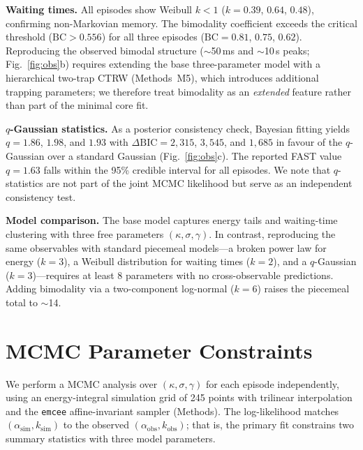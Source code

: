 \documentclass[twocolumn]{article}
\begin{document}
\textbf{Waiting times.} All episodes show Weibull $k < 1$ ($k = 0.39$, $0.64$, $0.48$), confirming non-Markovian memory. The bimodality coefficient exceeds the critical threshold ($\mathrm{BC} > 0.556$) for all three episodes ($\mathrm{BC} = 0.81$, $0.75$, $0.62$). Reproducing the observed bimodal structure ($\sim$50\,ms and $\sim$10\,s peaks; Fig.~\ref{fig:obs}b) requires extending the base three-parameter model with a hierarchical two-trap CTRW (Methods~M5), which introduces additional trapping parameters; we therefore treat bimodality as an \emph{extended} feature rather than part of the minimal core fit.

\textbf{$q$-Gaussian statistics.} As a posterior consistency check, Bayesian fitting yields $q = 1.86$, $1.98$, and $1.93$ with $\Delta\mathrm{BIC} = 2{,}315$, $3{,}545$, and $1{,}685$ in favour of the $q$-Gaussian over a standard Gaussian\cite{kass1995} (Fig.~\ref{fig:obs}c). The reported FAST value $q = 1.63$ falls within the 95\% credible interval for all episodes. We note that $q$-statistics are not part of the joint MCMC likelihood but serve as an independent consistency test.

\textbf{Model comparison.} The base model captures energy tails and waiting-time clustering with three free parameters $(\kappa, \sigma, \gamma)$. In contrast, reproducing the same observables with standard piecemeal models---a broken power law for energy ($k = 3$), a Weibull distribution for waiting times ($k = 2$), and a $q$-Gaussian ($k = 3$)---requires at least 8 parameters with no cross-observable predictions. Adding bimodality via a two-component log-normal ($k = 6$) raises the piecemeal total to $\sim$14.


\section{MCMC Parameter Constraints}
\label{sec:mcmc}

We perform a MCMC analysis over $(\kappa, \sigma, \gamma)$ for each episode independently, using an energy-integral simulation grid of 245 points with trilinear interpolation and the \texttt{emcee} affine-invariant sampler\cite{foremanmackey2013} (Methods). The log-likelihood matches $(\alpha_{\mathrm{sim}}, k_{\mathrm{sim}})$ to the observed $(\alpha_{\mathrm{obs}}, k_{\mathrm{obs}})$; that is, the primary fit constrains two summary statistics with three model parameters.
\end{document}
